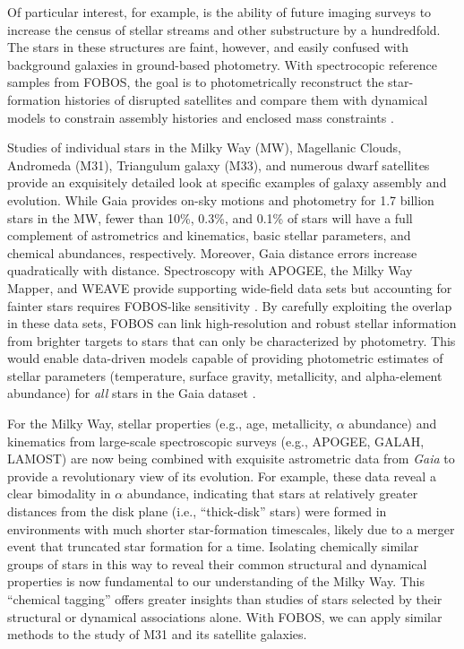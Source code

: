 \documentclass[11pt,a4paper,twoside,onecolumn,openany,final,oldfontcommands]{memoir}
\begin{document}
Of particular interest, for example, is the ability of future imaging surveys to increase the census of stellar streams and other substructure by a hundredfold.  The stars in these structures are faint, however, and easily confused with background galaxies in ground-based photometry.  With spectrocopic reference samples from FOBOS, the goal is to photometrically reconstruct the star-formation histories of disrupted satellites and compare them with dynamical models to constrain assembly histories and enclosed mass constraints \citep[e.g.,][]{2017ApJ...836..234S}.


Studies of individual stars in the Milky Way (MW), Magellanic Clouds, Andromeda (M31), Triangulum galaxy (M33), and numerous dwarf satellites provide an exquisitely detailed look at specific examples of galaxy assembly and evolution. While Gaia provides on-sky motions and photometry for 1.7 billion stars in the MW, fewer than 10\%, 0.3\%, and 0.1\% of stars will have a full complement of astrometrics and kinematics, basic stellar parameters, and chemical abundances, respectively.  Moreover, Gaia distance errors increase quadratically with distance.  Spectroscopy with APOGEE, the Milky Way Mapper, and WEAVE provide supporting wide-field data sets but accounting for fainter stars requires FOBOS-like sensitivity \citep[see][]{dey19,sanderson19}.  By carefully exploiting the overlap in these data sets, FOBOS can link high-resolution and robust stellar information from brighter targets to stars that can only be characterized by photometry.  This would enable data-driven models capable of providing photometric estimates of stellar parameters (temperature, surface gravity, metallicity, and alpha-element abundance) for {\it all} stars in the Gaia dataset  \citep[see][]{2015ApJ...808...16N, 2018arXiv180401530T, 2018arXiv180803278T}. 


For the Milky Way, stellar properties (e.g., age, metallicity, $\alpha$ abundance) and kinematics from large-scale spectroscopic surveys (e.g., APOGEE, GALAH, LAMOST) are now being combined with exquisite astrometric data from {\it Gaia} to provide a revolutionary view of its evolution.  For example, these data reveal a clear bimodality in $\alpha$ abundance, indicating that stars at relatively greater distances from the disk plane (i.e., ``thick-disk'' stars) were formed in environments with much shorter star-formation timescales, likely due to a merger event that truncated star formation for a time.  Isolating chemically similar groups of stars in this way to reveal their common structural and dynamical properties is now fundamental to our understanding of the Milky Way.  This ``chemical tagging'' offers greater insights than studies of stars selected by their structural or dynamical associations alone.  With FOBOS, we can apply similar methods to the study of M31 and its satellite galaxies.
\end{document}
